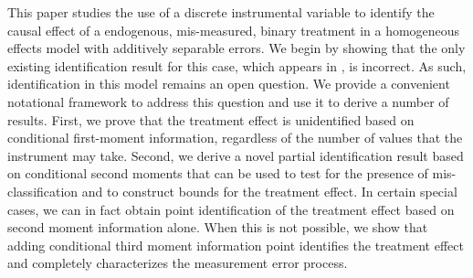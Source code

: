 This paper studies the use of a discrete instrumental variable to identify the causal effect of a endogenous, mis-measured, binary treatment in a homogeneous effects model with additively separable errors.
We begin by showing that the only existing identification result for this case, which appears in \cite{Mahajan}, is incorrect.
As such, identification in this model remains an open question.
We provide a convenient notational framework to address this question and use it to derive a number of results.
First, we prove that the treatment effect is unidentified based on conditional first-moment information, regardless of the number of values that the instrument may take.
Second, we derive a novel partial identification result based on conditional second moments that can be used to test for the presence of mis-classification and to construct bounds for the treatment effect.
In certain special cases, we can in fact obtain point identification of  the treatment effect based on second moment information alone.
When this is not possible, we show that adding conditional third moment information point identifies the treatment effect and completely characterizes the measurement error process.
